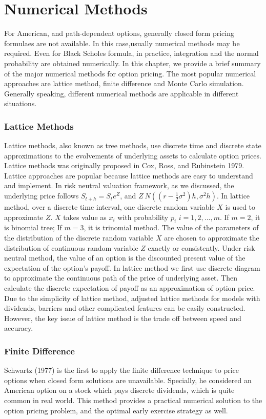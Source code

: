 \documentclass[11pt]{book}
\begin{document}
\chapter{Numerical Methods}

For American, and path-dependent options, generally closed form pricing formulaes are not available. In this case,usually numerical methods may be required. Even for Black Scholes formula, in practice, integration and the normal probability are obtained numerically. In this chapter, we provide a brief summary of the major numerical methods for option pricing. The most popular numerical approaches are lattice method, finite difference and Monte Carlo simulation. Generally speaking, different numerical methods are applicable in different situations. 
\subsection{Lattice Methods}
Lattice methods, also known as tree methods, use discrete time and discrete state approximations to the evolvements of underlying assets to calculate option prices. Lattice methods was originally proposed in
Cox, Ross, and Rubinstein 1979. Lattice approaches are popular because lattice methods are easy to understand and implement. In risk neutral valuation framework, as we discussed, the underlying price follows $S_{t+h} = S_t e^{Z}$, and $Z ~ N((r-\frac{1}{2} \sigma ^2)h,\sigma ^2 h)$. In lattice method, over a discrete time interval, one discrete random variable $X$ is used to approximate $Z$. $X$ takes value as $x_i$ with probability $p_i$ $i=1,2,...,m$. If $m=2$, it is binomial tree; If $m=3$, it is trinomial method. The value of the parameters of the distribution of the discrete random variable $X$ are chosen to approximate the distribution of continuous random variable $Z$ exactly or consistently. Under risk neutral method, the value of an option is the discounted present value of the expectation of the option's payoff. In lattice method we first use discrete diagram to approximate the continuous path of the price of underlying asset. Then calculate the discrete expectation of payoff as an approximation of option price. Due to the simplicity of lattice method, adjusted lattice methods for models with dividends, barriers and other complicated features can be easily constructed. However, the key issue of lattice method is the trade off between speed and accuracy. 




\subsection{Finite Difference}
Schwartz (1977) is the first to apply the finite difference
technique to price options when closed form solutions are
unavailable. Specially, he considered an American option on a stock
which pays discrete dividends, which is quite common in real world.
This method provides a practical numerical solution to the option
pricing problem, and the optimal early exercise strategy as well.
\end{document}
